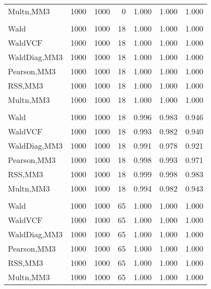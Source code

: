 \documentclass[
]{article}
\begin{document}
\begin{table}[H]
{\begin{tabular}[t]{lrrrrrr}
\hspace{1em}Multn,MM3 & 1000 & 1000 & 0 & 1.000 & 1.000 & 1.000\\
\addlinespace[0.3em]
\multicolumn{7}{l}{\textbf{1F 15V}}\\
\hspace{1em}Wald & 1000 & 1000 & 18 & 1.000 & 1.000 & 1.000\\
\hspace{1em}WaldVCF & 1000 & 1000 & 18 & 1.000 & 1.000 & 1.000\\
\hspace{1em}WaldDiag,MM3 & 1000 & 1000 & 18 & 1.000 & 1.000 & 1.000\\
\hspace{1em}Pearson,MM3 & 1000 & 1000 & 18 & 1.000 & 1.000 & 1.000\\
\hspace{1em}RSS,MM3 & 1000 & 1000 & 18 & 1.000 & 1.000 & 1.000\\
\hspace{1em}Multn,MM3 & 1000 & 1000 & 18 & 1.000 & 1.000 & 1.000\\
\addlinespace[0.3em]
\multicolumn{7}{l}{\textbf{2F 10V}}\\
\hspace{1em}Wald & 1000 & 1000 & 18 & 0.996 & 0.983 & 0.946\\
\hspace{1em}WaldVCF & 1000 & 1000 & 18 & 0.993 & 0.982 & 0.940\\
\hspace{1em}WaldDiag,MM3 & 1000 & 1000 & 18 & 0.991 & 0.978 & 0.921\\
\hspace{1em}Pearson,MM3 & 1000 & 1000 & 18 & 0.998 & 0.993 & 0.971\\
\hspace{1em}RSS,MM3 & 1000 & 1000 & 18 & 0.999 & 0.998 & 0.983\\
\hspace{1em}Multn,MM3 & 1000 & 1000 & 18 & 0.994 & 0.982 & 0.943\\
\addlinespace[0.3em]
\multicolumn{7}{l}{\textbf{3F 15V}}\\
\hspace{1em}Wald & 1000 & 1000 & 65 & 1.000 & 1.000 & 1.000\\
\hspace{1em}WaldVCF & 1000 & 1000 & 65 & 1.000 & 1.000 & 1.000\\
\hspace{1em}WaldDiag,MM3 & 1000 & 1000 & 65 & 1.000 & 1.000 & 1.000\\
\hspace{1em}Pearson,MM3 & 1000 & 1000 & 65 & 1.000 & 1.000 & 1.000\\
\hspace{1em}RSS,MM3 & 1000 & 1000 & 65 & 1.000 & 1.000 & 1.000\\
\hspace{1em}Multn,MM3 & 1000 & 1000 & 65 & 1.000 & 1.000 & 1.000\\
\bottomrule
\end{tabular}}
\endgroup{}
\end{table}
\end{document}
